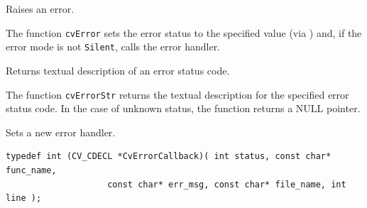 \label{Error}

Raises an error.


\begin{description}
\end{description}

The function \texttt{cvError} sets the error status to the specified value (via ) and, if the error mode is not \texttt{Silent}, calls the error handler.

\label{ErrorStr}

Returns textual description of an error status code.


\begin{description}
\end{description}

The function \texttt{cvErrorStr} returns the textual description for
the specified error status code. In the case of unknown status, the function
returns a NULL pointer.

\label{RedirectError}

Sets a new error handler.

\begin{lstlisting}
typedef int (CV_CDECL *CvErrorCallback)( int status, const char* func_name,
                    const char* err_msg, const char* file_name, int line );
\end{lstlisting}


